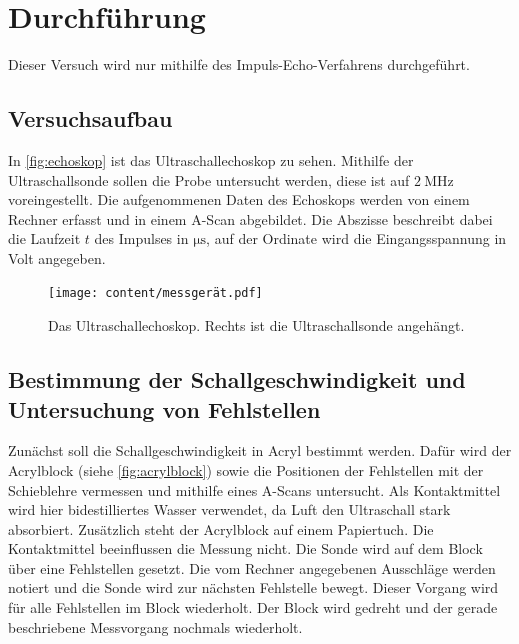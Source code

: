 \section{Durchführung}
\label{sec:Durchführung}

Dieser Versuch wird nur mithilfe des Impuls-Echo-Verfahrens durchgeführt.

\subsection{Versuchsaufbau}
\label{subsec:versuchsaufbau}
In \autoref{fig:echoskop} ist das Ultraschallechoskop zu sehen.
Mithilfe der Ultraschallsonde sollen die Probe untersucht werden, diese ist auf $\SI{2}{\mega\hertz}$ voreingestellt.
Die aufgenommenen Daten des Echoskops werden von einem Rechner erfasst und in einem A-Scan abgebildet.
Die Abszisse beschreibt dabei die Laufzeit $t$ des Impulses in $\si{\micro\second}$, auf der Ordinate wird die Eingangsspannung in Volt angegeben.

\begin{figure}
    \centering
    \texttt{[image: content/messgerät.pdf]}
    \caption{Das Ultraschallechoskop. Rechts ist die Ultraschallsonde angehängt.\cite{anleitung}}
    \label{fig:echoskop}
\end{figure}

\subsection{Bestimmung der Schallgeschwindigkeit und Untersuchung von Fehlstellen}
\label{aufgabe_1}
Zunächst soll die Schallgeschwindigkeit in Acryl bestimmt werden.
Dafür wird der Acrylblock (siehe \autoref{fig:acrylblock}) sowie die Positionen der Fehlstellen mit der Schieblehre vermessen und mithilfe eines A-Scans untersucht.
Als Kontaktmittel wird hier bidestilliertes Wasser verwendet, da Luft den Ultraschall stark absorbiert.
Zusätzlich steht der Acrylblock auf einem Papiertuch.
Die Kontaktmittel beeinflussen die Messung nicht.
Die Sonde wird auf dem Block über eine Fehlstellen gesetzt.
Die vom Rechner angegebenen Ausschläge werden notiert und die Sonde wird zur nächsten Fehlstelle bewegt.
Dieser Vorgang wird für alle Fehlstellen im Block wiederholt.
Der Block wird gedreht und der gerade beschriebene Messvorgang nochmals wiederholt.

